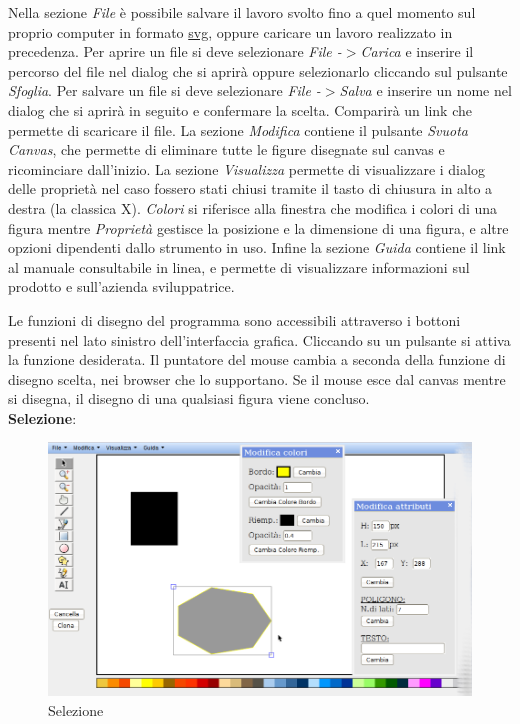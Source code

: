  
Nella sezione \textit{File} \`e possibile salvare il lavoro svolto fino a quel momento sul proprio computer in formato \underline{svg}, oppure caricare un lavoro realizzato in precedenza.
Per aprire un file si deve selezionare \textit{File -$ > $Carica} e inserire il percorso del file nel dialog che si aprir\`a oppure selezionarlo cliccando sul pulsante \textit{Sfoglia}.
Per salvare un file si deve selezionare \textit{File -$ > $Salva} e inserire un nome nel dialog che si aprir\`a in seguito e confermare la scelta. Comparir\`a un link che permette di scaricare il file.
La sezione \textit{Modifica} contiene il pulsante \textit{Svuota Canvas}, che permette di eliminare tutte le figure disegnate sul canvas e ricominciare dall'inizio.
La sezione \textit{Visualizza} permette di visualizzare i dialog delle propriet\`a nel caso fossero stati chiusi tramite il tasto di chiusura in alto a destra (la classica X). \textit{Colori} si riferisce alla finestra che modifica i colori di una figura mentre \textit{Propriet\`a} gestisce la posizione e la dimensione di una figura, e altre opzioni dipendenti dallo strumento in uso.
Infine la sezione \textit{Guida} contiene il link al manuale consultabile in linea, e permette di visualizzare informazioni sul prodotto e sull'azienda sviluppatrice.
\newpage
 
Le funzioni di disegno del programma sono accessibili attraverso i bottoni presenti nel lato sinistro dell'interfaccia grafica. Cliccando su un pulsante si attiva la funzione desiderata. Il puntatore del mouse cambia a seconda della funzione di disegno scelta, nei browser che lo supportano. Se il mouse esce dal canvas mentre si disegna, il disegno di una qualsiasi figura viene concluso. \\
 
\textbf{Selezione}:\\
\begin{figure}[!ht]
\centering
\includegraphics[scale=0.5]{images/selezione.png}
\caption{Selezione}
\end{figure}
 
